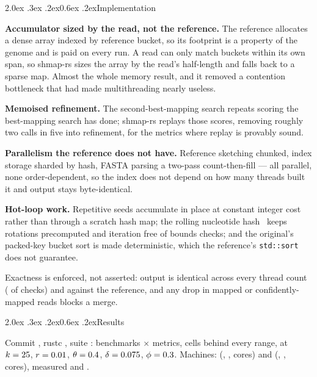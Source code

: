 \documentclass[10pt,a4paper,twocolumn]{article}
\makeatletter
\renewcommand\section{\@startsection{section}{1}{0pt}%
  {2.0ex \@plus .3ex \@minus .2ex}{0.6ex \@plus.2ex}{\normalsize\bfseries}}
\makeatother
\begin{document}
\section{Implementation}

\textbf{Accumulator sized by the read, not the reference.} The reference
allocates a dense array indexed by reference bucket, so its footprint is a
property of the genome and is paid on every run. A read can only match buckets
within its own span, so shmap-rs sizes the array by the read's half-length and
falls back to a sparse map. Almost the whole memory result, and it removed a
contention bottleneck that had made multithreading nearly useless.

\textbf{Memoised refinement.} The second-best-mapping search repeats scoring
the best-mapping search has done; shmap-rs replays those scores, removing
roughly two calls in five into refinement, for the metrics where replay is
provably sound.

\textbf{Parallelism the reference does not have.} Reference sketching chunked,
index storage sharded by hash, FASTA parsing a two-pass count-then-fill --- all
parallel, none order-dependent, so the index does not depend on how many
threads built it and output stays byte-identical.

\textbf{Hot-loop work.} Repetitive seeds accumulate in place at constant
integer cost rather than through a scratch hash map; the rolling nucleotide
hash~\cite{nthash} keeps rotations precomputed and iteration free of bounds
checks; and the original's packed-key bucket sort is made deterministic, which
the reference's \texttt{std::sort} does not guarantee.

Exactness is enforced, not asserted: output is identical across every thread
count (\shmDetChecks{} of \shmDetTotal{} checks) and against the reference, and
any drop in mapped or confidently-mapped reads blocks a merge.

\section{Results}

{\small}

Commit \texttt{\shmCommit}, rustc \shmRustc, suite \shmSuiteVersion:
\shmNumBenchmarks{} benchmarks $\times$ \shmNumMetrics{} metrics,
\shmNumCells{} cells behind every range, at $k=25$, $r=0.01$,
$\theta=0.4$, $\delta=0.075$, $\phi=0.3$. Machines:
\texttt{\shmHostX} (\shmArchX, \shmTopologyX, \shmCoresX{} cores) and
\texttt{\shmHostA} (\shmArchA, \shmTopologyA, \shmCoresA{} cores), measured
\shmMeasuredX{} and \shmMeasuredA.
\end{document}
